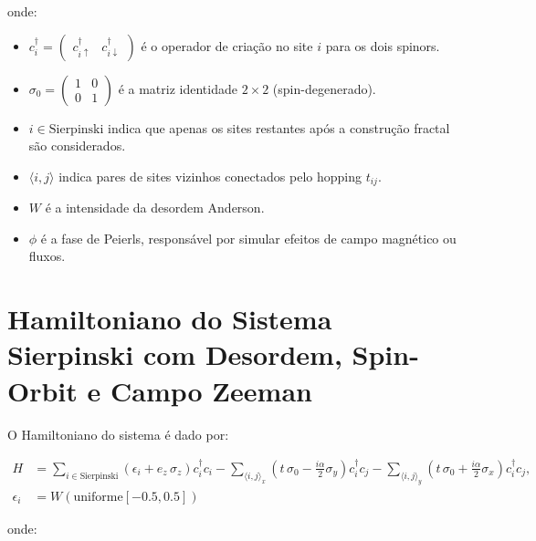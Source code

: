 \documentclass[a4paper,12pt]{article}
\begin{document}
	\noindent onde:
	
	\begin{itemize}
		\item $c_i^\dagger = \begin{pmatrix} c_{i\uparrow}^\dagger & c_{i\downarrow}^\dagger \end{pmatrix}$ é o operador de criação no site $i$ para os dois spinors.
		\item $\sigma_0 = \begin{pmatrix} 1 & 0 \\ 0 & 1 \end{pmatrix}$ é a matriz identidade $2 \times 2$ (spin-degenerado).
		\item $i \in \text{Sierpinski}$ indica que apenas os sites restantes após a construção fractal são considerados.
		\item $\langle i,j \rangle$ indica pares de sites vizinhos conectados pelo hopping $t_{ij}$.
		\item $W$ é a intensidade da desordem Anderson.
		\item $\phi$ é a fase de Peierls, responsável por simular efeitos de campo magnético ou fluxos.
	\end{itemize}
	
	
	
	
	
	\section*{Hamiltoniano do Sistema Sierpinski com Desordem, Spin-Orbit e Campo Zeeman}
	
	O Hamiltoniano do sistema é dado por:
	
	\begin{equation}
		\begin{aligned}
			H &= \sum_{i \in \text{Sierpinski}} \left( \epsilon_i + e_z \, \sigma_z \right) c_i^\dagger c_i
			- \sum_{\langle i,j \rangle_x} \left( t \, \sigma_0 - \frac{i \alpha}{2} \sigma_y \right) c_i^\dagger c_j
			- \sum_{\langle i,j \rangle_y} \left( t \, \sigma_0 + \frac{i \alpha}{2} \sigma_x \right) c_i^\dagger c_j, \\
			\epsilon_i &= W \left( \text{uniforme}[-0.5, 0.5] \right)
		\end{aligned}
	\end{equation}
	
	\noindent onde:
	
\end{document}
